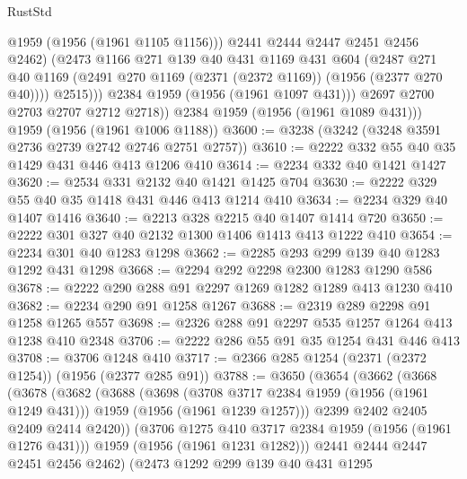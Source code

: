 \begin{lexlean}{RustStd}
\begin{coremodule}
                    @1959
                    (@1956 (@1961 @1105 @1156)))
                  @2441
                  @2444
                  @2447
                  @2451
                  @2456
                  @2462)
                (@2473
                  @1166
                  @271
                  @139
                  @40
                  @431
                  @1169
                  @431
                  @604
                  (@2487
                    @271
                    @40
                    @1169
                    (@2491 @270 @1169 (@2371 (@2372 @1169)) (@1956 (@2377 @270 @40))))
                  @2515)))
            @2384
            @1959
            (@1956 (@1961 @1097 @431)))
          @2697
          @2700
          @2703
          @2707
          @2712
          @2718))
      @2384
      @1959
      (@1956 (@1961 @1089 @431)))
    @1959
    (@1956 (@1961 @1006 @1188))
@3600 := @3238 (@3242 (@3248 @3591 @2736 @2739 @2742 @2746 @2751 @2757))
@3610 := @2222 @332 @55 @40 @35 @1429 @431 @446 @413 @1206 @410
@3614 := @2234 @332 @40 @1421 @1427
@3620 := @2534 @331 @2132 @40 @1421 @1425 @704
@3630 := @2222 @329 @55 @40 @35 @1418 @431 @446 @413 @1214 @410
@3634 := @2234 @329 @40 @1407 @1416
@3640 := @2213 @328 @2215 @40 @1407 @1414 @720
@3650 := @2222 @301 @327 @40 @2132 @1300 @1406 @1413 @413 @1222 @410
@3654 := @2234 @301 @40 @1283 @1298
@3662 := @2285 @293 @299 @139 @40 @1283 @1292 @431 @1298
@3668 := @2294 @292 @2298 @2300 @1283 @1290 @586
@3678 := @2222 @290 @288 @91 @2297 @1269 @1282 @1289 @413 @1230 @410
@3682 := @2234 @290 @91 @1258 @1267
@3688 := @2319 @289 @2298 @91 @1258 @1265 @557
@3698 := @2326 @288 @91 @2297 @535 @1257 @1264 @413 @1238 @410 @2348
@3706 := @2222 @286 @55 @91 @35 @1254 @431 @446 @413
@3708 := @3706 @1248 @410
@3717 := @2366 @285 @1254 (@2371 (@2372 @1254)) (@1956 (@2377 @285 @91))
@3788 := @3650
    (@3654
      (@3662
        (@3668
          (@3678
            (@3682
              (@3688
                (@3698
                  (@3708 @3717 @2384 @1959 (@1956 (@1961 @1249 @431)))
                  @1959
                  (@1956 (@1961 @1239 @1257)))
                @2399
                @2402
                @2405
                @2409
                @2414
                @2420))
            (@3706 @1275 @410 @3717 @2384 @1959 (@1956 (@1961 @1276 @431)))
            @1959
            (@1956 (@1961 @1231 @1282)))
          @2441
          @2444
          @2447
          @2451
          @2456
          @2462)
        (@2473
          @1292
          @299
          @139
          @40
          @431
          @1295

\end{coremodule}
\end{lexlean}
